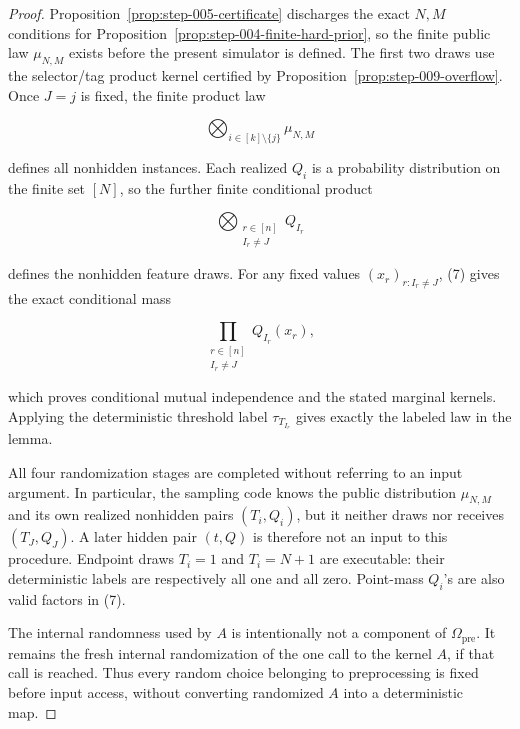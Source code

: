 \begin{proof}
Proposition~\ref{prop:step-005-certificate} discharges the exact
\(N,M\) conditions for Proposition~\ref{prop:step-004-finite-hard-prior}, so the finite public law
\(\mu_{N,M}\) exists before the present simulator is defined. The first two
draws use the selector/tag product kernel certified by Proposition~\ref{prop:step-009-overflow}. Once \(J=j\) is fixed, the finite
product law

\[
  \bigotimes_{i\in[k]\setminus\{j\}}\mu_{N,M}
\]

defines all nonhidden instances. Each realized \(Q_i\) is a probability
distribution on the finite set \([N]\), so the further finite conditional
product

\[
  \bigotimes_{\substack{r\in[n]\\ I_r\ne J}}Q_{I_r}
\tag{7}
\]

defines the nonhidden feature draws. For any fixed values
\((x_r)_{r:I_r\ne J}\), (7) gives the exact conditional mass

\[
  \prod_{\substack{r\in[n]\\ I_r\ne J}}Q_{I_r}(x_r),
\tag{8}
\]

which proves conditional mutual independence and the stated marginal
kernels. Applying the deterministic threshold label
\(\tau_{T_{I_r}}\) gives exactly the labeled law in the lemma.

All four randomization stages are completed without referring to an input
argument. In particular, the sampling code knows the public distribution
\(\mu_{N,M}\) and its own realized nonhidden pairs
\((T_i,Q_i)\), but it neither draws nor receives \((T_J,Q_J)\).
A later hidden pair \((t,Q)\) is therefore not an input to this procedure.
Endpoint draws \(T_i=1\) and \(T_i=N+1\) are executable: their deterministic
labels are respectively all one and all zero. Point-mass \(Q_i\)'s are also
valid factors in (7).

The internal randomness used by \(A\) is intentionally not a component of
\(\Omega_{\mathrm{pre}}\). It remains the fresh internal randomization of
the one call to the kernel \(A\), if that call is reached. Thus every
random choice belonging to preprocessing is fixed before input access,
without converting randomized \(A\) into a deterministic map.
\end{proof}

